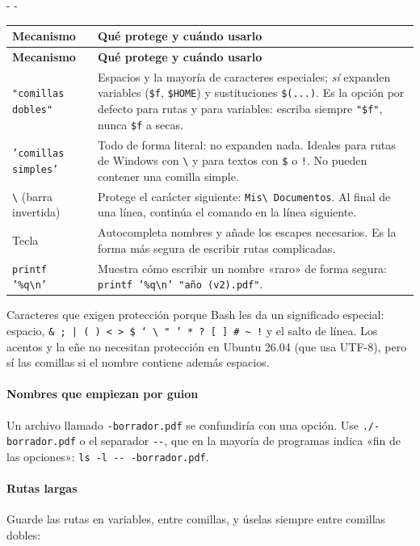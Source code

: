 \documentclass[11pt,a4paper]{article}
\makeatletter
\newcommand{\necesitaespacio}[1]{\par\penalty-100\begingroup
	\setlength{\dimen@}{#1}\dimen@ii\pagegoal\advance\dimen@ii-\pagetotal
	\ifdim\dimen@>\dimen@ii\ifdim\dimen@ii>\z@\vfil\fi\penalty-\@M\fi\endgroup}
\newcommand{\cmd}[1]{\texttt{\textcolor{colcmd}{#1}}}      %
\newcommand{\opt}[1]{\texttt{\textcolor{colopt}{#1}}}      %
\newcommand{\arch}[1]{\texttt{\textcolor{colarch}{#1}}}    %
\newcommand{\tecla}[1]{\tcbox[on line, boxsep=0pt, left=3pt, right=3pt,
	top=1.5pt, bottom=1.5pt, colback=white, colframe=codigoborde,
	boxrule=0.5pt, arc=2pt]{\footnotesize\sffamily #1}}
\newcommand{\cab}[1]{\textbf{#1}}
\newcommand{\bs}{\textbackslash{}}    %
\newcommand{\tl}{\textasciitilde{}}  %
\makeatother
\begin{document}
	\begingroup\small
	\necesitaespacio{21\baselineskip}
	\begin{longtable}{L{3.6cm}L{11.46cm}}
		\toprule{}\cab{Mecanismo} & \cab{Qué protege y cuándo usarlo}\\\midrule
		\endfirsthead
		\toprule{}\cab{Mecanismo} & \cab{Qué protege y cuándo usarlo}\\\midrule
		\endhead
		\bottomrule
		\endfoot
		\texttt{"comillas dobles"} & Espacios y la mayoría de caracteres especiales; \emph{sí} expanden variables (\texttt{\$f}, \texttt{\$HOME}) y sustituciones \texttt{\$(...)}. Es la opción por defecto para rutas y para variables: escriba siempre \texttt{"\$f"}, nunca \texttt{\$f} a secas.\\*
		\texttt{'comillas simples'} & Todo de forma literal: no expanden nada. Ideales para rutas de Windows con \texttt{\bs} y para textos con \texttt{\$} o \texttt{!}. No pueden contener una comilla simple.\\
		\texttt{\bs} (barra invertida) & Protege el carácter siguiente: \texttt{Mis\bs{} Documentos}. Al final de una línea, continúa el comando en la línea siguiente.\\
		Tecla \tecla{Tab} & Autocompleta nombres y añade los escapes necesarios. Es la forma más segura de escribir rutas complicadas.\\*
		\cmd{printf '\%q\bs{}n'} & Muestra cómo escribir un nombre «raro» de forma segura: \cmd{printf '\%q\bs{}\allowbreak{}n' "año (v2).pdf"}.\\
	\end{longtable}
	\endgroup
	
	Caracteres que exigen protección porque Bash les da un significado especial: espacio, \texttt{\& ; | ( ) < > \$ ` \bs{}\allowbreak{} " ' * ? [ ] \# \tl{} !} y el salto de línea. Los acentos y la eñe no necesitan protección en Ubuntu 26.04 (que usa UTF-8), pero sí las comillas si el nombre contiene además espacios.
	
	\paragraph{Nombres que empiezan por guion} Un archivo llamado \arch{-borrador.pdf} se confundiría con una opción. Use \arch{./-borrador.pdf} o el separador \opt{-{}-}, que en la mayoría de programas indica «fin de las opciones»: \cmd{ls -l -{}- -borrador.pdf}.
	
	\paragraph{Rutas largas} Guarde las rutas en variables, entre comillas, y úselas siempre entre comillas dobles:
	
\end{document}
